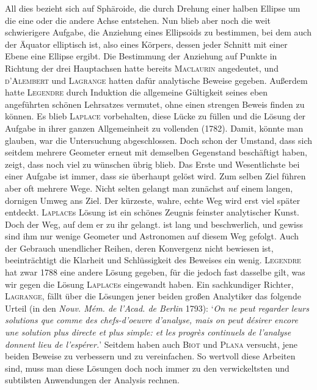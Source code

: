 All dies bezieht sich auf Sphäroide, die durch Drehung einer halben Ellipse um die eine oder die andere Achse entstehen. Nun blieb aber noch die weit schwierigere Aufgabe, die Anziehung eines Ellipsoids zu bestimmen, bei dem auch der Äquator elliptisch ist, also eines Körpers, dessen jeder Schnitt mit einer Ebene eine Ellipse ergibt. Die Bestimmung der Anziehung auf Punkte in Richtung der drei Hauptachsen hatte bereits \textsc{Maclaurin} angedeutet, und \textsc{d'Alembert} und \textsc{Lagrange} hatten dafür analytische Beweise gegeben. Außerdem hatte \textsc{Legendre} durch Induktion die allgemeine Gültigkeit seines eben angeführten schönen Lehrsatzes vermutet, ohne einen strengen Beweis finden zu können. Es blieb \textsc{Laplace} vorbehalten, diese Lücke zu füllen und die Lösung der Aufgabe in ihrer ganzen Allgemeinheit zu vollenden (1782). Damit, könnte man glauben, war die Untersuchung abgeschlossen. Doch schon der Umstand, dass sich seitdem mehrere Geometer erneut mit demselben Gegenstand beschäftigt haben, zeigt, dass noch viel zu wünschen übrig blieb. Das Erste und Wesentlichste bei einer Aufgabe ist immer, dass sie überhaupt gelöst wird. Zum selben Ziel führen aber oft mehrere Wege. Nicht selten gelangt man zunächst auf einem langen, dornigen Umweg ans Ziel. Der kürzeste, wahre, echte Weg wird erst viel später entdeckt. \textsc{Laplace}s Lösung ist ein schönes Zeugnis feinster analytischer Kunst. Doch der Weg, auf dem er zu ihr gelangt. ist lang und beschwerlich, und gewiss sind ihm nur wenige Geometer und
Astronomen auf diesem Weg gefolgt. Auch der Gebrauch unendlicher Reihen, deren Konvergenz nicht bewiesen ist, beeinträchtigt die Klarheit und Schlüssigkeit des Beweises ein wenig. \textsc{Legendre} hat zwar 1788 eine andere Lösung gegeben, für die jedoch fast dasselbe gilt, was wir gegen die Lösung \textsc{Laplace}s eingewandt haben. Ein sachkundiger Richter, \textsc{Lagrange}, fällt über die Lösungen jener beiden großen Analytiker das folgende Urteil (in den \textit{Nouv. Mém. de l'Acad. de Berlin} 1793): ‘\textit{On ne peut regarder leurs solutions que comme des chefs-d'oeuvre d'analyse, mais on peut désirer encore une solution plus directe et plus simple: et les progrès continuels de l'analyse donnent lieu de l'espérer.}’ Seitdem haben auch \textsc{Biot} und \textsc{Plana} versucht, jene beiden Beweise zu verbessern und zu vereinfachen. So wertvoll diese Arbeiten sind, muss man diese Lösungen doch noch immer zu den verwickeltsten und subtilsten Anwendungen der Analysis rechnen.

